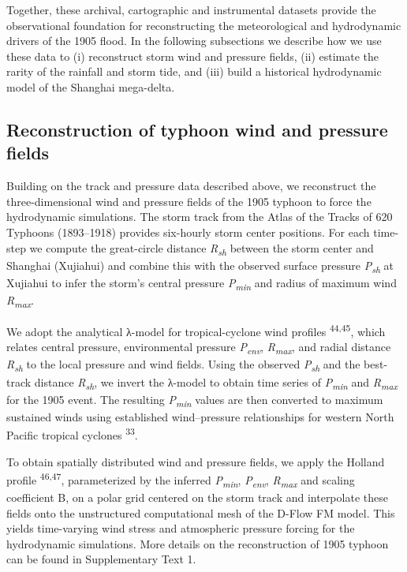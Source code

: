 \documentclass[
]{article}
\begin{document}
Together, these archival, cartographic and instrumental datasets provide
the observational foundation for reconstructing the meteorological and
hydrodynamic drivers of the 1905 flood. In the following subsections we
describe how we use these data to (i) reconstruct storm wind and
pressure fields, (ii) estimate the rarity of the rainfall and storm
tide, and (iii) build a historical hydrodynamic model of the Shanghai
mega-delta.

\subsection{\texorpdfstring{\textbf{Reconstruction of typhoon wind and
pressure
fields}}{Reconstruction of typhoon wind and pressure fields}}\label{reconstruction-of-typhoon-wind-and-pressure-fields}

Building on the track and pressure data described above, we reconstruct
the three-dimensional wind and pressure fields of the 1905 typhoon to
force the hydrodynamic simulations. The storm track from the Atlas of
the Tracks of 620 Typhoons (1893--1918) provides six-hourly storm center
positions. For each time-step we compute the great-circle distance
\emph{R\textsubscript{sh}} between the storm center and Shanghai
(Xujiahui) and combine this with the observed surface pressure
\emph{P\textsubscript{sh}} at Xujiahui to infer the storm's central
pressure \emph{P\textsubscript{min}} and radius of maximum wind
\emph{R\textsubscript{max}}.

We adopt the analytical λ-model for tropical-cyclone wind profiles
\textsuperscript{44,45}, which relates central pressure, environmental
pressure \emph{P\textsubscript{env}}, \emph{R\textsubscript{max}}, and
radial distance \emph{R\textsubscript{sh}} to the local pressure and
wind fields. Using the observed \emph{P\textsubscript{sh}} and the
best-track distance \emph{R\textsubscript{sh}}, we invert the λ-model to
obtain time series of \emph{P\textsubscript{min}} and
\emph{R\textsubscript{max}} for the 1905 event. The resulting
\emph{P\textsubscript{min}} values are then converted to maximum
sustained winds using established wind--pressure relationships for
western North Pacific tropical cyclones \textsuperscript{33}.

To obtain spatially distributed wind and pressure fields, we apply the
Holland profile \textsuperscript{46,47}, parameterized by the inferred
\emph{P\textsubscript{min}}, \emph{P\textsubscript{env}},
\emph{R\textsubscript{max}} and scaling coefficient B, on a polar grid
centered on the storm track and interpolate these fields onto the
unstructured computational mesh of the D-Flow FM model. This yields
time-varying wind stress and atmospheric pressure forcing for the
hydrodynamic simulations. More details on the reconstruction of 1905
typhoon can be found in Supplementary Text 1.
\end{document}
